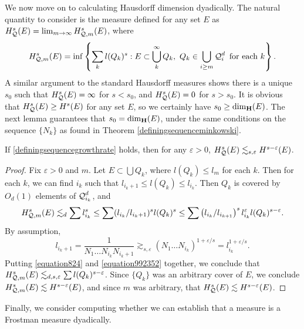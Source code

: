 We now move on to calculating Hausdorff dimension dyadically. The natural quantity to consider is the measure defined for any set $E$ as $H^s_{\operatorname{\mathcal{Q}}}(E) = \lim_{m \to \infty} H^s_{\operatorname{\mathcal{Q}},m}(E)$, where
%
\[ H^s_{\DQ,m}(E) = \inf \left\{ \sum_k l(Q_k)^s : E \subset \bigcup_k^\infty Q_k,\ Q_k \in \bigcup_{i \geq m} \DQ_i^d\ \text{for each $k$} \right\}. \]
%
A similar argument to the standard Hausdorff measures shows there is a unique $s_0$ such that $H^s_{\operatorname{\mathcal{Q}}}(E) = \infty$ for $s < s_0$, and $H^s_{\operatorname{\mathcal{Q}}}(E) = 0$ for $s > s_0$. It is obvious that $H^s_{\operatorname{\mathcal{Q}}}(E) \geq H^s(E)$ for any set $E$, so we certainly have $s_0 \geq \operatorname{\dim_{\mathbf{H}}}(E)$. The next lemma guarantees that $s_0 = \operatorname{\dim_{\mathbf{H}}}(E)$, under the same conditions on the sequence $\{ N_k \}$ as found in Theorem \ref{definingsequenceminkowski}.

\begin{lemma} \label{lemma51464}
	If \eqref{definingsequencegrowthrate} holds, then for any $\varepsilon > 0$, $H^s_{\operatorname{\mathcal{Q}}}(E) \lesssim_{s,\varepsilon} H^{s-\varepsilon}(E)$.
\end{lemma}
\begin{proof}
	Fix $\varepsilon > 0$ and $m$. Let $E \subset \bigcup Q_k$, where $l(Q_k) \leq l_m$ for each $k$. Then for each $k$, we can find $i_k$ such that $l_{i_k+1} \leq l(Q_k) \leq l_{i_k}$. Then $Q_k$ is covered by $O_d(1)$ elements of $\operatorname{\mathcal{Q}}_{i_k}^d$, and
	\begin{equation} \label{equation824} H^s_{\operatorname{\mathcal{Q}},m}(E) \lesssim_d \sum l_{i_k}^s \leq \sum (l_{i_k}/l_{i_k+1})^s l(Q_k)^s \leq \sum \left( l_{i_k}/l_{i_{k+1}} \right)^s l_{i_k}^\varepsilon l(Q_k)^{s - \varepsilon}. \end{equation}
	By assumption,
	\begin{equation} \label{equation992352}
		l_{i_k+1} = \frac{1}{N_1 \dots N_{i_k} N_{i_k+1}} \gtrsim_{s,\varepsilon} (N_1 \dots N_{i_k})^{1+ \varepsilon/s} = l_{i_k}^{1 + \varepsilon/s}.
	\end{equation}
	Putting \eqref{equation824} and \eqref{equation992352} together, we conclude that $H^s_{\operatorname{\mathcal{Q}},m}(E) \lesssim_{d,s,\varepsilon} \sum l(Q_k)^{s-\varepsilon}$. Since $\{ Q_k \}$ was an arbitrary cover of $E$, we conclude $H^s_{\operatorname{\mathcal{Q}},m}(E) \lesssim H^{s-\varepsilon}(E)$, and since $m$ was arbitrary, that $H^s_{\operatorname{\mathcal{Q}}}(E) \lesssim H^{s-\varepsilon}(E)$.
\end{proof}

Finally, we consider computing whether we can establish that a measure is a Frostman measure dyadically.

